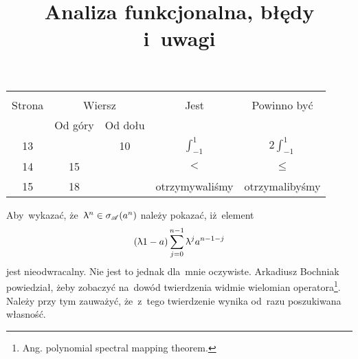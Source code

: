 \documentclass[a4paper,11pt]{article}
\title{Analiza funkcjonalna, błędy i~uwagi}
\begin{document}



\maketitle %





\begin{center}
  \begin{tabular}{|c|c|c|c|c|}
    \hline
    & \multicolumn{2}{c|}{} & & \\
    Strona & \multicolumn{2}{c|}{Wiersz}& Jest & Powinno być \\ \cline{2-3}
    & Od góry & Od dołu &  &  \\ \hline
    13  & & 10 & $\int^{ 1 }_{ -1 }$ & $2 \int^{ 1 }_{ -1 }$ \\
    14  & 15 & & $<$ & $\leq$ \\
    15  & 18 & & otrzymywaliśmy & otrzymalibyśmy \\
    \hline
  \end{tabular}
\end{center}

\vspace{\spaceTwo}











\start {} 
Aby~wykazać, że~$\uplambda^{ n } \in \sigma_{ \mathcal{ A } }( a^{ n })$ należy
pokazać, iż~element
\begin{equation*}
  ( \uplambda 1 - a ) \sum\limits_{ j = 0 }^{ n - 1 } \uplambda^{ j } a^{ n - 1 - j }
\end{equation*}
jest nieodwracalny. Nie jest to jednak dla~mnie oczywiste. Arkadiusz
Bochniak powiedział, żeby zobaczyć na~dowód twierdzenia widmie
wielomian operatora\footnote{Ang. polynomial spectral mapping
  theorem.}. Należy przy tym zauważyć, że~z~tego twierdzenie wynika
od~razu poszukiwana własność.
\end{document}
